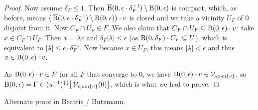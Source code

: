 \begin{proof}
Now assume $\delta_F \leq 1$. Then $\operatorname{\overline{B}}(0, \epsilon\cdot\delta_F^{-1})\setminus \operatorname{B}(0,\epsilon)$ is compact, which, as before, means $\big(\operatorname{\overline{B}}(0, \epsilon\cdot\delta_F^{-1})\setminus \operatorname{B}(0,\epsilon)\big)\cdot v$ is closed and we take a vicinity $U_F$ of $0$ disjoint from it. Now $C_F\cap U_F\in F$. We also claim that $C_F\cap U_F\subseteq \operatorname{B}(0,\epsilon)\cdot v$: take $x\in C_F\cap U_F$. Then $x = \lambda v$ and $\delta_F |\lambda| \leq \epsilon$ (as $\operatorname{B}(0, \delta_F)\cdot C_F \subseteq U$), which is equivalent to $|\lambda| \leq \epsilon\cdot\delta_F^{-1}$. Now because $x\in U_F$, this means $|\lambda| < \epsilon$ and thus $x\in \operatorname{B}(0,\epsilon)\cdot v$.

As $\operatorname{B}(0,\epsilon)\cdot v \in F$ for all $F$ that converge to $0$, we have $\operatorname{B}(0,\epsilon)\cdot v\in \operatorname{\mathcal{V}}_{\operatorname{span}\{v\}}$, so $\operatorname{B}(0,\epsilon) = \Gamma \in (u^{-1})^{\downarrow\downarrow}\big[\operatorname{\mathcal{V}}_{\operatorname{span}\{v\}}(0)\big]$, which is what we had to prove.
\end{proof}

Alternate proof in Beattie / Butzmann.

